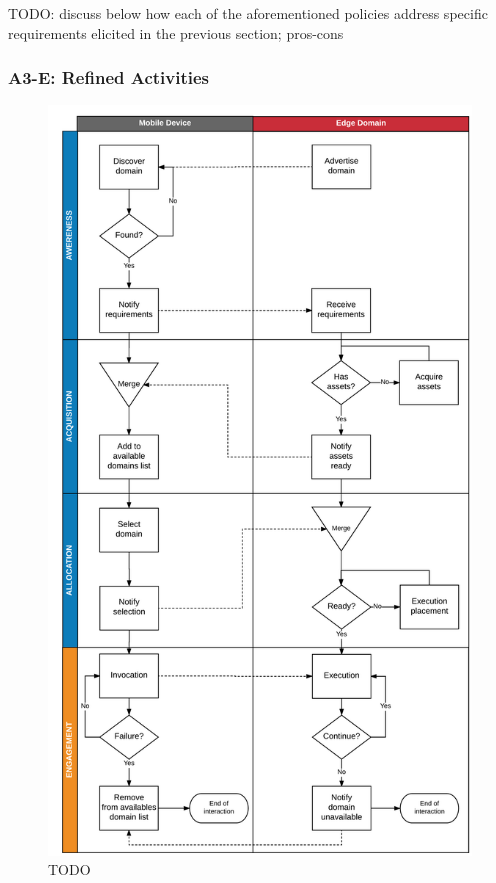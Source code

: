 TODO: discuss below how each of the aforementioned policies address specific requirements elicited in the previous section; pros-cons

\subsubsection{A3-E: Refined Activities}\label{sec:a3-e-activities}

\begin{figure}
  \includegraphics[height=\textheight]{figs/activities.png}
  \caption{TODO}
  \label{fig:activities}
\end{figure}

